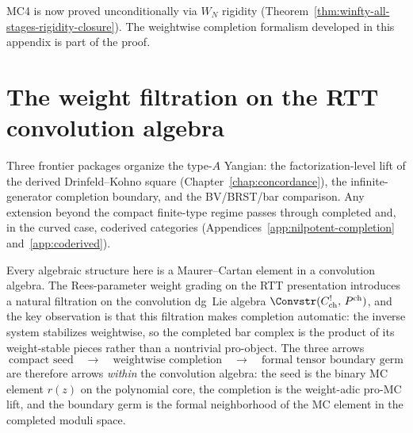 \begin{remark}
MC4 is now proved unconditionally via $W_N$ rigidity
(Theorem~\ref{thm:winfty-all-stages-rigidity-closure}). The weightwise
completion formalism developed in this appendix is part of the proof.
\end{remark}

\section{The weight filtration on the RTT convolution algebra}
\label{sec:typeA-organizing-principle}

Three frontier packages organize the type-$A$ Yangian: the
factorization-level lift of the derived Drinfeld--Kohno square
(Chapter~\ref{chap:concordance}), the infinite-generator completion
boundary, and the BV/BRST/bar comparison. Any extension beyond the
compact finite-type regime passes through completed and, in the curved
case, coderived categories
(Appendices~\ref{app:nilpotent-completion} and~\ref{app:coderived}).

Every algebraic structure here is a Maurer--Cartan element in a
convolution algebra. The Rees-parameter weight grading on the RTT
presentation introduces a natural filtration on the convolution dg~Lie
algebra $\Convstr(C^!_{\mathrm{ch}},\, P^{\mathrm{ch}})$, and the key
observation is that this filtration makes completion automatic: the
inverse system stabilizes weightwise, so the completed bar complex is
the product of its weight-stable pieces rather than a nontrivial
pro-object. The three arrows
\begin{equation}
\text{compact seed} \quad \longrightarrow \quad
\text{weightwise completion} \quad \longrightarrow \quad
\text{formal tensor boundary germ}
\end{equation}
are therefore arrows \emph{within} the convolution algebra: the seed is
the binary MC element $r(z)$ on the polynomial core, the completion is
the weight-adic pro-MC lift, and the boundary germ is the formal
neighborhood of the MC element in the completed moduli space.

